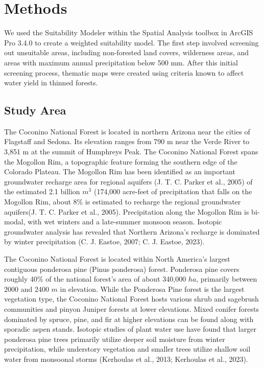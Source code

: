 \documentclass[
]{agujournal2019}
\begin{document}
\section{Methods}\label{methods}

We used the Suitability Modeler within the Spatial Analysis toolbox in
ArcGIS Pro 3.4.0 to create a weighted suitability model. The first step
involved screening out unsuitable areas, including non-forested land
covers, wilderness areas, and areas with maximum annual precipitation
below 500 mm. After this initial screening process, thematic maps were
created using criteria known to affect water yield in thinned forests.

\subsection{Study Area}\label{study-area}

The Coconino National Forest is located in northern Arizona near the
cities of Flagstaff and Sedona. Its elevation ranges from 790 m near the
Verde River to 3,851 m at the summit of Humphreys Peak. The Coconino
National Forest spans the Mogollon Rim, a topographic feature forming
the southern edge of the Colorado Plateau. The Mogollon Rim has been
identified as an important groundwater recharge area for regional
aquifers (J. T. C. Parker et al., 2005) of the estimated 2.1 billion
\(m^3\) (174,000 acre-feet of precipitation that falls on the Mogollon
Rim, about 8\% is estimated to recharge the regional groundwater
aquifers(J. T. C. Parker et al., 2005). Precipitation along the Mogollon
Rim is bi-modal, with wet winters and a late-summer monsoon season.
Isotopic groundwater analysis has revealed that Northern Arizona's
recharge is dominated by winter precipitation (C. J. Eastoe, 2007; C. J.
Eastoe, 2023).

The Coconino National Forest is located within North America's largest
contiguous ponderosa pine (Pinus ponderosa) forest. Ponderosa pine
covers roughly 40\% of the national forest's area of about 340,000
\(ha\), primarily between 2000 and 2400 \(m\) in elevation. While the
Ponderosa Pine forest is the largest vegetation type, the Coconino
National Forest hosts various shrub and sagebrush communities and pinyon
Juniper forests at lower elevations. Mixed conifer forests dominated by
spruce, pine, and fir at higher elevations can be found along with
sporadic aspen stands. Isotopic studies of plant water use have found
that larger ponderosa pine trees primarily utilize deeper soil moisture
from winter precipitation, while understory vegetation and smaller trees
utilize shallow soil water from monsoonal storms (Kerhoulas et al.,
2013; Kerhoulas et al., 2023).
\end{document}
